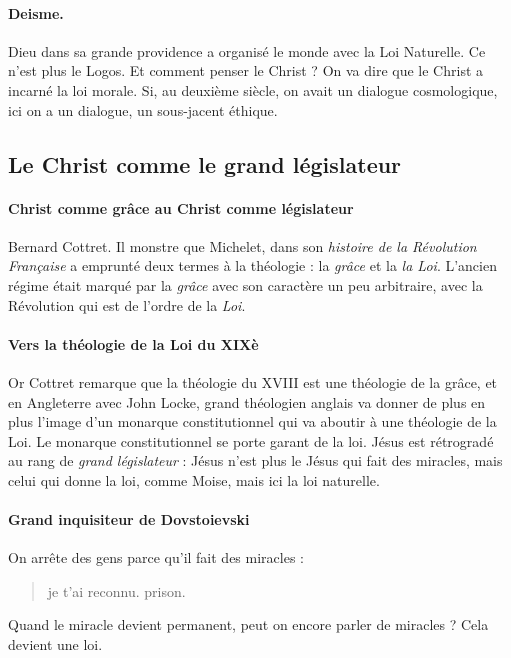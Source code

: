 \paragraph{Deisme.} Dieu dans sa grande providence a organisé le monde avec la Loi Naturelle. Ce n'est plus le Logos. Et comment penser le Christ ? On va dire que le Christ a incarné la loi morale. Si, au deuxième siècle, on avait un dialogue cosmologique, ici on a un dialogue, un sous-jacent éthique.

\subsection{Le Christ comme le grand législateur} 

\paragraph{Christ comme grâce au Christ comme législateur} Bernard Cottret. Il monstre que Michelet, dans son \textit{histoire de la Révolution Française} a emprunté deux termes à la théologie : la \textit{grâce} et la \textit{la Loi}. L'ancien régime était marqué par la \textit{grâce} avec son caractère un peu arbitraire, avec la Révolution qui est de l'ordre de la \textit{Loi}. 

\paragraph{Vers la théologie de la Loi du XIXè} Or Cottret remarque que la théologie du XVIII est une théologie de la grâce, et en Angleterre avec John Locke, grand théologien anglais va donner de plus en plus l'image d'un monarque constitutionnel qui va aboutir à une théologie de la Loi. Le monarque constitutionnel se porte garant de la loi. 
Jésus est rétrogradé au rang de \textit{grand législateur} : Jésus n'est plus le Jésus qui fait des miracles, mais celui qui donne la loi, comme Moise, mais ici la loi naturelle. 

\paragraph{Grand inquisiteur de Dovstoievski} On arrête des gens parce qu'il fait des miracles : 
\begin{quote}
    je t'ai reconnu. prison. 
\end{quote}
Quand le miracle devient permanent, peut on encore parler de miracles ? Cela devient une loi.  

